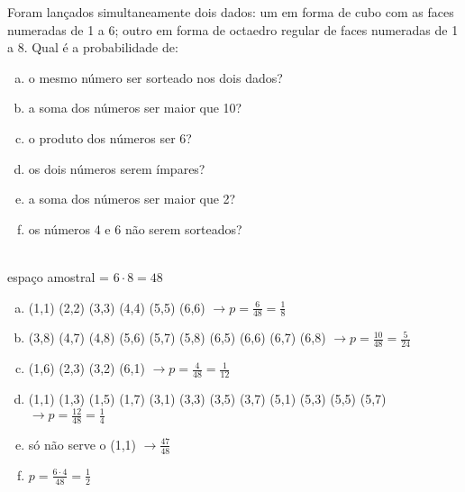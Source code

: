 \begin{ex}
Foram lançados simultaneamente dois dados: um em forma de cubo com as faces numeradas de 1 a 6; outro em forma de octaedro regular de faces numeradas de 1 a 8. Qual é a probabilidade de:
   \begin{enumerate}[(a)]
   \item o mesmo número ser sorteado nos dois dados?
   \item a soma dos números ser maior que 10?
   \item o produto dos números ser 6?
   \item os dois números serem ímpares?
   \item a soma dos números ser maior  que 2?
   \item os números 4 e 6 não serem sorteados?
   \end{enumerate}
     \begin{sol}
       \phantom{A}\\
       espaço amostral = $6\cdot8=48$ 
         \begin{enumerate} [(a)]
             \item (1,1) (2,2) (3,3) (4,4) (5,5) (6,6) $\rightarrow p=\frac{6}{48}=\frac{1}{8}$
             \item (3,8) (4,7) (4,8) (5,6) (5,7) (5,8) (6,5) (6,6) (6,7) (6,8) $\rightarrow p=\frac{10}{48}=\frac{5}{24}$
             \item (1,6) (2,3) (3,2) (6,1) $\rightarrow p=\frac{4}{48}=\frac{1}{12}$
             \item (1,1) (1,3) (1,5) (1,7) (3,1) (3,3) (3,5) (3,7) (5,1) (5,3) (5,5) (5,7) $\rightarrow p=\frac{12}{48}=\frac{1}{4}$
             \item só não serve o (1,1) $\rightarrow \frac{47}{48}$
             \item $p=\frac{6\cdot4}{48}=\frac{1}{2}$
         \end{enumerate}
     \end{sol}
\end{ex}